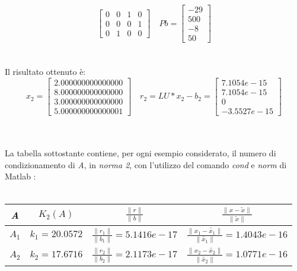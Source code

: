 \begin{description}
\[\begin{bmatrix}
			0 & 0 & 1 & 0 \\
			0 & 0 & 0 & 1 \\
			0 & 1 & 0 & 0 
		\end{bmatrix} \quad
		Pb =\begin{bmatrix}
			-29 \\
			500 \\
			-8  \\
			50               
		\end{bmatrix}
		\]\\\\
	Il risultato ottenuto è:\\
		\[
		x_2 =\begin{bmatrix}
			  2.000000000000000 \\
		  	8.000000000000000 \\
		  	3.000000000000000 \\
		  	5.000000000000001 
		\end{bmatrix} \quad
		r_2 = LU*x_2-b_2 =\begin{bmatrix}
			7.1054e-15 \\
		  	7.1054e-15 \\
		  	0 \\
		  	-3.5527e-15 
		\end{bmatrix}
		\]\\\\
\end{description}
La tabella sottostante contiene, per ogni esempio considerato, il numero di condizionamento di \textit{A}, in \textit{norma 2}, con l'utilizzo del comando \textit{cond} e \textit{norm} di Matlab :\\\
\begin{center}
	\begin{tabular}{ | c | c | c | c | }
		\hline
			\textit{A} & $K_2(A)$ & $\frac{\|r\|}{\|b\|}$ & $\frac{\|x-\tilde{x}\|}{\|\tilde{x}\|}$ \\
		\hline
			$A_1$ & $k_1=20.0572$ & $\frac{\|r_1\|}{\|b_1\|}=5.1416e-17$ & $\frac{\|x_1-\tilde{x_1}\|}{\|\tilde{x_1}\|}=1.4043e-16$ \\
			$A_2$ &	$k_2=17.6716$ & $\frac{\|r_2\|}{\|b_2\|}=2.1173e-17$ & $\frac{\|x_2-\tilde{x_2}\|}{\|\tilde{x_2}\|}=1.0771e-16$ \\
		\hline
	\end{tabular}
\end{center}